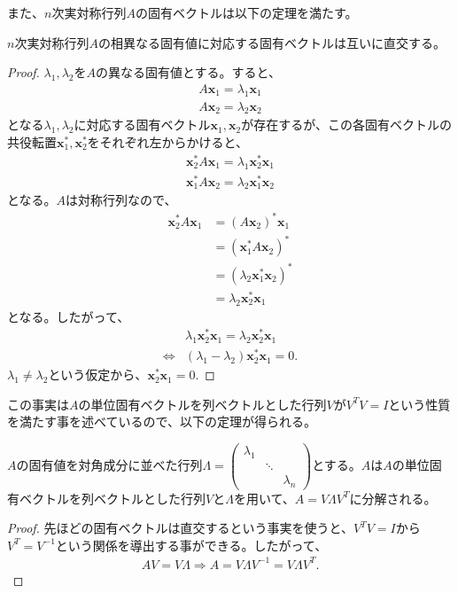 また、$n$次実対称行列$A$の固有ベクトルは以下の定理を満たす。
\begin{theorem}
  $n$次実対称行列$A$の相異なる固有値に対応する固有ベクトルは互いに直交する。
\end{theorem}
\begin{proof}
  $\lambda_1,\lambda_2$を$A$の異なる固有値とする。すると、
  \begin{align*}
    A \mathbf{x}_1 = \lambda_1 \mathbf{x}_1 \\
    A \mathbf{x}_2 = \lambda_2 \mathbf{x}_2
  \end{align*}
  となる$\lambda_1, \lambda_2$に対応する固有ベクトル$\mathbf{x}_1, \mathbf{x}_2$が存在するが、この各固有ベクトルの共役転置$\mathbf{x}_1^*, \mathbf{x}_2^*$をそれぞれ左からかけると、
  \begin{align*}
    \mathbf{x}_2^* A \mathbf{x}_1 = \lambda_1 \mathbf{x}_2^* \mathbf{x}_1 \\
    \mathbf{x}_1^* A \mathbf{x}_2 = \lambda_2 \mathbf{x}_1^* \mathbf{x}_2
  \end{align*}
  となる。$A$は対称行列なので、
  \begin{align*}
    \mathbf{x}_2^* A \mathbf{x}_1 & = \left(A \mathbf{x}_2\right)^* \mathbf{x}_1 \\
                                  & = \left(\mathbf{x}_1^* A \mathbf{x}_2\right)^* \\
                                  & = \left(\lambda_2 \mathbf{x}_1^* \mathbf{x}_2\right)^* \\
                                  & = \lambda_2 \mathbf{x}_2^* \mathbf{x}_1
  \end{align*}
  となる。したがって、
  \begin{align*}
                    & \lambda_1 \mathbf{x}_2^* \mathbf{x}_1 = \lambda_2 \mathbf{x}_2^* \mathbf{x}_1 \\
    \Leftrightarrow & \left(\lambda_1 - \lambda_2\right) \mathbf{x}_2^* \mathbf{x}_1 = 0.
  \end{align*}
  $\lambda_1 \not= \lambda_2$という仮定から、$\mathbf{x}_2^* \mathbf{x}_1 = 0$.
\end{proof}
この事実は$A$の単位固有ベクトルを列ベクトルとした行列$V$が$V^T V = I$という性質を満たす事を述べているので、以下の定理が得られる。
\begin{theorem}
  $A$の固有値を対角成分に並べた行列$\Lambda = \displaystyle{\left(\begin{array}{ccc} \lambda_1 & & \\ & \ddots & \\ & & \lambda_n \end{array}\right)}$とする。$A$は$A$の単位固有ベクトルを列ベクトルとした行列$V$と$\Lambda$を用いて、$A = V \Lambda V^T$に分解される。
\end{theorem}
\begin{proof}
  先ほどの固有ベクトルは直交するという事実を使うと、$V^T V = I$から$V^T = V^{-1}$という関係を導出する事ができる。したがって、
  \begin{align*}
    A V = V \Lambda \Rightarrow A = V \Lambda V^{-1} = V \Lambda V^T.
  \end{align*}
\end{proof}

